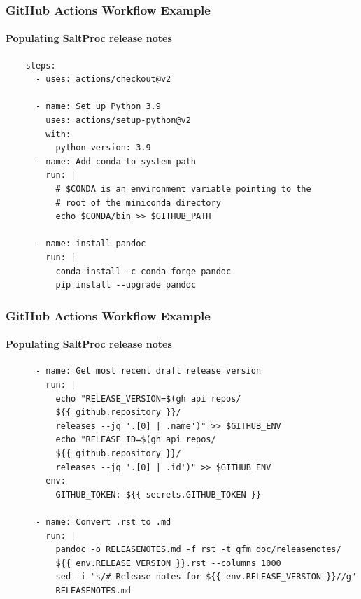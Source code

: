 \begin{frame}[fragile]
    \frametitle{GitHub Actions Workflow Example}
    \framesubtitle{Populating SaltProc release notes}
    \begin{verbatim}
    steps:
      - uses: actions/checkout@v2

      - name: Set up Python 3.9
        uses: actions/setup-python@v2
        with:
          python-version: 3.9
      - name: Add conda to system path
        run: |
          # $CONDA is an environment variable pointing to the
          # root of the miniconda directory
          echo $CONDA/bin >> $GITHUB_PATH

      - name: install pandoc 
        run: |
          conda install -c conda-forge pandoc
          pip install --upgrade pandoc
    \end{verbatim}

\end{frame}

\begin{frame}[fragile]
    \frametitle{GitHub Actions Workflow Example}
    \framesubtitle{Populating SaltProc release notes}
    \begin{verbatim}
      - name: Get most recent draft release version
        run: |
          echo "RELEASE_VERSION=$(gh api repos/
          ${{ github.repository }}/
          releases --jq '.[0] | .name')" >> $GITHUB_ENV
          echo "RELEASE_ID=$(gh api repos/
          ${{ github.repository }}/
          releases --jq '.[0] | .id')" >> $GITHUB_ENV
        env:
          GITHUB_TOKEN: ${{ secrets.GITHUB_TOKEN }}

      - name: Convert .rst to .md 
        run: |
          pandoc -o RELEASENOTES.md -f rst -t gfm doc/releasenotes/
          ${{ env.RELEASE_VERSION }}.rst --columns 1000
          sed -i "s/# Release notes for ${{ env.RELEASE_VERSION }}//g"
          RELEASENOTES.md
    \end{verbatim}

\end{frame}


